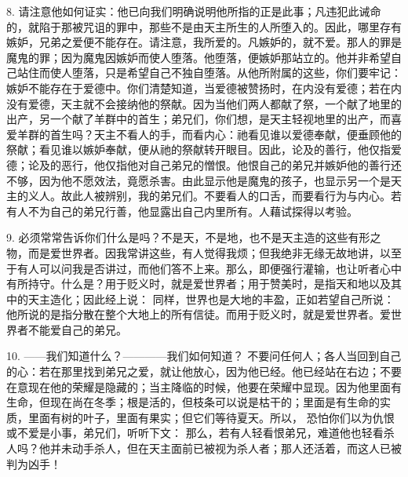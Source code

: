 8. 请注意他如何证实：他已向我们明确说明他所指的正是此事；凡违犯此诫命的，就陷于那被咒诅的罪中，那些不是由天主所生的人所堕入的。因此，哪里存有嫉妒，兄弟之爱便不能存在。请注意，我所爱的。凡嫉妒的，就不爱。那人的罪是魔鬼的罪；因为魔鬼因嫉妒而使人堕落。他堕落，便嫉妒那站立的。他并非希望自己站住而使人堕落，只是希望自己不独自堕落。从他所附属的这些，你们要牢记：嫉妒不能存在于爱德中。你们清楚知道，当爱德被赞扬时，在内没有爱德；若在内没有爱德，天主就不会接纳他的祭献。因为当他们两人都献了祭，一个献了地里的出产，另一个献了羊群中的首生；弟兄们，你们想，是天主轻视地里的出产，而喜爱羊群的首生吗？天主不看人的手，而看内心：祂看见谁以爱德奉献，便垂顾他的祭献；看见谁以嫉妒奉献，便从祂的祭献转开眼目。因此，论及的善行，他仅指爱德；论及的恶行，他仅指他对自己弟兄的憎恨。他恨自己的弟兄并嫉妒他的善行还不够，因为他不愿效法，竟愿杀害。由此显示他是魔鬼的孩子，也显示另一个是天主的义人。故此人被辨别，我的弟兄们。不要看人的口舌，而要看行为与内心。若有人不为自己的弟兄行善，他显露出自己内里所有。人藉试探得以考验。\par

9. 必须常常告诉你们什么是吗？不是天，不是地，也不是天主造的这些有形之物，而是爱世界者。因我常讲这些，有人觉得我烦；但我绝非无缘无故地讲，以至于有人可以问我是否讲过，而他们答不上来。那么，即便强行灌输，也让听者心中有所持守。什么是？用于贬义时，就是爱世界者；用于赞美时，是指天和地以及其中的天主造化；因此经上说： 同样，世界也是大地的丰盈，正如若望自己所说： 他所说的是指分散在整个大地上的所有信徒。而用于贬义时，就是爱世界者。爱世界者不能爱自己的弟兄。\par

10. ——我们知道什么？————我们如何知道？ 不要问任何人；各人当回到自己的心：若在那里找到弟兄之爱，就让他放心，因为他已经。他已经站在右边；不要在意现在他的荣耀是隐藏的；当主降临的时候，他要在荣耀中显现。因为他里面有生命，但现在尚在冬季；根是活的，但枝条可以说是枯干的；里面是有生命的实质，里面有树的叶子，里面有果实；但它们等待夏天。所以， 恐怕你们以为仇恨或不爱是小事，弟兄们，听听下文： 那么，若有人轻看恨弟兄，难道他也轻看杀人吗？他并未动手杀人，但在天主面前已被视为杀人者；那人还活着，而这人已被判为凶手！\par

